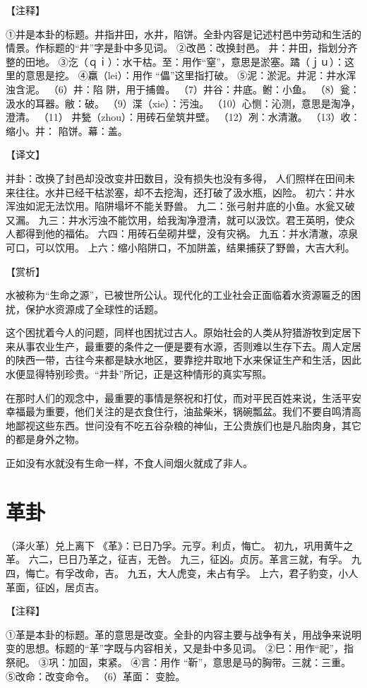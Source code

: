 \documentclass[a4paper,12pt,UTF8,twoside]{ctexbook}
\begin{document}
【注释】

①井是本卦的标题。井指井田，水井，陷饼。全卦内容是记述村邑中劳动和生活的情景。作标题的“井”字是卦中多见词。
②改邑：改换封邑。 井：井田，指划分齐整的田地。
③汔（ｑｉ）：水干枯。至：用作“窒”，意思是淤塞。蹫（ｊｕ）：这里的意思是挖。
④羸（lei）：用作 “儡”这里指打破。
⑤泥：淤泥。井泥：井水浑浊含泥。
（6）井：陷 阱，用于捕兽。
（7）井谷：井底。鲋：小鱼。
（8）瓮：汲水的耳器。敝：破。
（9）渫（xie）：污浊。
（10）心恻：沁测，意思是淘净，澄清。
（11） 井甃（zhou）：用砖石垒筑井壁。
（12）冽：水清澈。
（13）收：缩小。井： 陷饼。幕：盖。

【译文】

并卦：改换了封邑却没改变井田数目，没有损失也没有多得， 人们照样在田间未来往往。水井已经干枯淤塞，却不去挖淘，还打破了汲水瓶，凶险。
初六：井水浑浊如泥无法饮用。陷阱塌坏不能关野兽。
九二：张弓射井底的小鱼。水瓮又破又漏。
九三：井水污浊不能饮用，给我淘净澄清，就可以汲饮。君王英明，使众人都得到他的福佑。
六四：用砖石垒砌井壁，没有灾祸。
九五：并水清澈，凉泉可口，可以饮用。
上六：缩小陷阱口，不加阱盖，结果捕获了野兽，大吉大利。

【赏析】

水被称为“生命之源”，已被世所公认。现代化的工业社会正面临着水资源匾乏的困扰，保护水资源成了全球性的话题。

这个困扰着今人的问题，同样也困扰过古人。原始社会的人类从狩猎游牧到定居下来从事农业生产，最重要的条件之一便是要有水源，否则难以生存下去。周人定居的陕西一带，古往今来都是缺水地区，要靠挖井取地下水来保证生产和生活，因此水便显得特别珍贵。“井卦”所记，正是这种情形的真实写照。

在那时人们的观念中，最重要的事情是祭祝和打仗，而对平民百姓来说，生活平安幸福最为重要，他们关注的是衣食住行，油盐柴米，锅碗瓢盆。我们不要自鸣清高地鄙视这些东西。世问没有不吃五谷杂粮的神仙，王公贵族们也是凡胎肉身，其它的都是身外之物。

正如没有水就没有生命一样，不食人间烟火就成了非人。

\chapter{革卦}

（泽火革）兑上离下
《革》：已日乃孚。元亨。利贞，悔亡。
初九，巩用黄牛之革。
六二，巳日乃革之，征吉，无咎。
九三，征凶。贞厉。革言三就，有孚。
九四，悔亡。有孚改命，吉。
九五，大人虎变，未占有孚。
上六，君子豹变，小人革面，征凶，居贞吉。

【注释】

①革是本卦的标题。革的意思是改变。全卦的内容主要与战争有关，用战争来说明变的思想。标题的“革”字既与内容相关，又是卦中多见词。
②巳：用作“祀”，指祭祀。
③巩：加固，束紧。
④言：用作 “靳”，意思是马的胸带。三就：三重。
⑤改命：改变命令。
（6）革面： 变脸。
\end{document}
